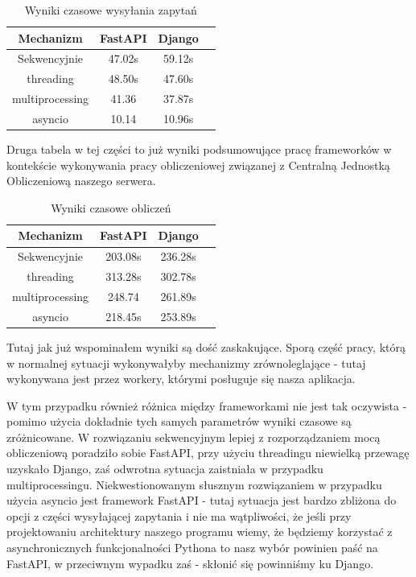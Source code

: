 \begin{table}[ht]
\caption{Wyniki czasowe wysyłania zapytań}
\centering
\begin{tabular}{c c c c}
\hline\hline
Mechanizm & FastAPI & Django \\ [0.5ex]

\hline
Sekwencyjnie & 47.02s & 59.12s \\
threading & 48.50s & 47.60s \\
multiprocessing & 41.36 & 37.87s \\
asyncio & 10.14 & 10.96s \\[1ex]
\hline
\end{tabular}
\end{table}

Druga tabela w tej części to już wyniki podsumowujące pracę frameworków w kontekście wykonywania pracy obliczeniowej związanej z Centralną Jednostką Obliczeniową naszego serwera.
\begin{table}[ht]
\caption{Wyniki czasowe obliczeń}
\centering
\begin{tabular}{c c c c}
\hline\hline
Mechanizm & FastAPI & Django \\ [0.5ex]

\hline
Sekwencyjnie & 203.08s & 236.28s \\
threading & 313.28s & 302.78s \\
multiprocessing & 248.74 & 261.89s \\
asyncio & 218.45s & 253.89s \\[1ex]
\hline
\end{tabular}
\end{table}

Tutaj jak już wspominałem wyniki są dość zaskakujące. Sporą część pracy, którą w normalnej sytuacji wykonywałyby mechanizmy zrównoleglające - tutaj wykonywana jest przez workery, którymi posługuje się nasza aplikacja.

W tym przypadku również różnica między frameworkami nie jest tak oczywista - pomimo użycia dokładnie tych samych parametrów wyniki czasowe są zróżnicowane. W rozwiązaniu sekwencyjnym lepiej z rozporządzaniem mocą obliczeniową poradziło sobie FastAPI, przy użyciu threadingu niewielką przewagę uzyskało Django, zaś odwrotna sytuacja zaistniała w przypadku multiprocessingu. Niekwestionowanym słusznym rozwiązaniem w przypadku użycia asyncio jest framework FastAPI - tutaj sytuacja jest bardzo zbliżona do opcji z części wysyłającej zapytania i nie ma wątpliwości, że jeśli przy projektowaniu architektury naszego programu wiemy, że będziemy korzystać z asynchronicznych funkcjonalności Pythona to nasz wybór powinien paść na FastAPI, w przeciwnym wypadku zaś - skłonić się powinniśmy ku Django.